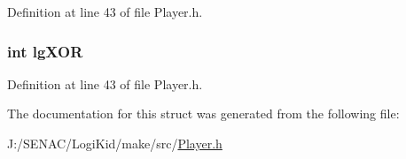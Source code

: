 Definition at line 43 of file Player.\-h.

\hypertarget{struct_logic_gates_a5c54f5251d91f4d8b7ba09a9ed1c1cc3}{
\subsubsection[{lg\-X\-O\-R}]{\setlength{\rightskip}{0pt plus 5cm}int lg\-X\-O\-R}}\label{struct_logic_gates_a5c54f5251d91f4d8b7ba09a9ed1c1cc3}


Definition at line 43 of file Player.\-h.



The documentation for this struct was generated from the following file\-:\begin{DoxyCompactItemize}
\item 
J\-:/\-S\-E\-N\-A\-C/\-Logi\-Kid/make/src/\hyperlink{_player_8h}{Player.\-h}\end{DoxyCompactItemize}
